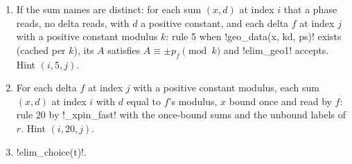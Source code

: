 {{{\begin{algorithm}\label{alg:lean-export-sym-xchoice}
\begin{enumerate}
\item If the sum names are distinct: for each sum $(x, d)$ at index $i$ that a phase reads, no
delta reads, with $d$ a positive constant, and each delta $f$ at index $j$ with a positive
constant modulus $k$: rule 5 when \lexpy!geo_data(x, kd, ps)! exists (cached per $k$), its $A$
satisfies $A \equiv \pm p_f \pmod k$ and \lexpy!elim_geo1! accepts. Hint $(i, 5, j)$.
\item For each delta $f$ at index $j$ with a positive constant modulus, each sum $(x, d)$ at
index $i$ with $d$ equal to $f$'s modulus, $x$ bound once and read by $f$: rule 20 by
\lexpy!_xpin_fast! with the once-bound sums and the unbound labels of $r$. Hint $(i, 20, j)$.
\item \lexpy!elim_choice(t)!.
\end{enumerate}
\end{algorithm}

}}}
